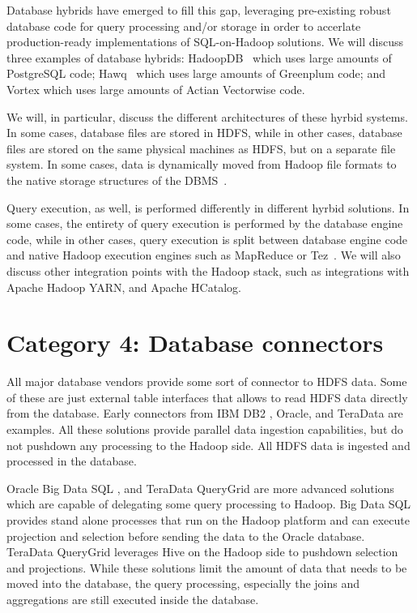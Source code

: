 \documentclass{vldb}
\begin{document}
Database hybrids have emerged to fill this gap, leveraging
pre-existing robust database code for query processing and/or storage
in order to accerlate production-ready implementations of
SQL-on-Hadoop solutions. We will discuss three examples of database
hybrids: HadoopDB~\cite{hadoopdb} which uses large amounts of
PostgreSQL code; Hawq~\cite{hawq} which uses large amounts of
Greenplum code; and Vortex which uses large amounts of Actian
Vectorwise code. 

We will, in particular, discuss the different architectures of these
hyrbid systems. In some cases, database files are stored in HDFS,
while in
other cases, database files are stored on the same physical machines
as HDFS, but on a separate file system. In some cases, data is
dynamically moved from Hadoop file formats to the native storage
structures of the DBMS~\cite{invisible-loading}.

Query execution, as well, is performed differently in different hyrbid
solutions. In some cases,
the entirety of 
query execution is performed by the database engine code, while in
other cases, query execution is split between database engine code and
native Hadoop execution engines such as MapReduce or Tez~\cite{split-execution}. We will also
discuss other integration points with the Hadoop stack, such as
integrations with Apache Hadoop YARN, and Apache HCatalog.

\section{Category 4: Database connectors}

All major database vendors provide some sort of connector to HDFS data. Some of these are just external table interfaces that allows to read HDFS data directly from the database. Early connectors from IBM DB2 \cite{ibm-sigmod2011}, Oracle, and TeraData are examples.
All these solutions provide parallel data ingestion capabilities, but do not pushdown any processing to the Hadoop side. All HDFS data is ingested and processed in the database.

Oracle Big Data SQL \cite{bigdataSQL}, and TeraData QueryGrid \cite{queryGrid} are more advanced solutions which are capable of delegating some query processing to Hadoop. Big Data SQL provides stand alone processes that run on the Hadoop platform and can execute projection and selection before sending the data to the Oracle database. TeraData QueryGrid leverages Hive on the Hadoop side to pushdown selection and projections. While these solutions limit the amount of data that needs to be moved into the database, the query processing, especially the joins and aggregations are still executed inside the database.
\end{document}
